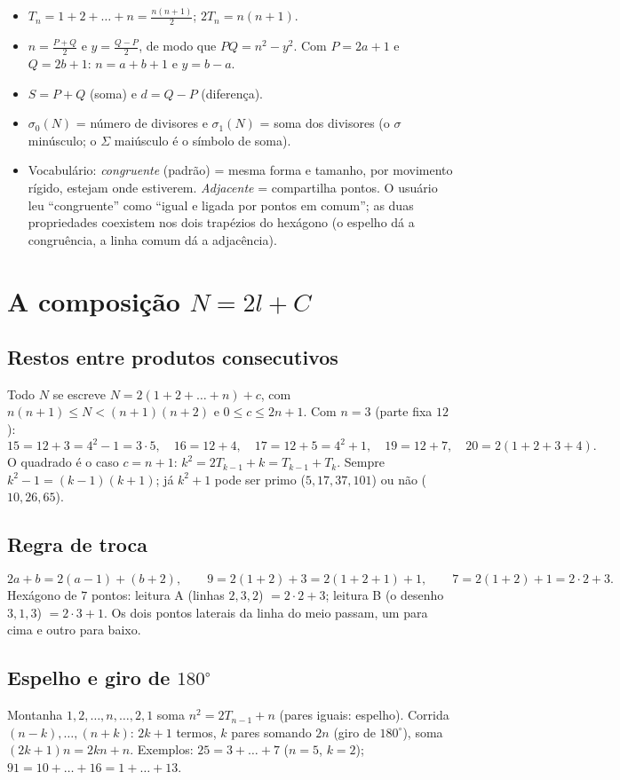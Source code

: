 \documentclass[11pt,a4paper]{article}
\begin{document}
\begin{itemize}[leftmargin=1.4em]
  \item $T_n=1+2+\dots+n=\tfrac{n(n+1)}{2}$; $2T_n=n(n+1)$.
  \item $n=\tfrac{P+Q}{2}$ e $y=\tfrac{Q-P}{2}$, de modo que $PQ=n^2-y^2$. Com $P=2a+1$ e $Q=2b+1$: $n=a+b+1$ e $y=b-a$.
  \item $S=P+Q$ (soma) e $d=Q-P$ (diferença).
  \item $\sigma_0(N)$ = número de divisores e $\sigma_1(N)$ = soma dos divisores (o $\sigma$ minúsculo; o $\Sigma$ maiúsculo é o símbolo de soma).
  \item Vocabulário: \emph{congruente} (padrão) = mesma forma e tamanho, por movimento rígido, estejam onde estiverem. \emph{Adjacente} = compartilha pontos. O usuário leu ``congruente'' como ``igual e ligada por pontos em comum''; as duas propriedades coexistem nos dois trapézios do hexágono (o espelho dá a congruência, a linha comum dá a adjacência).
\end{itemize}

\section{A composição $N=2l+C$}

\subsection{Restos entre produtos consecutivos}
Todo $N$ se escreve $N=2(1+2+\dots+n)+c$, com $n(n+1)\le N<(n+1)(n+2)$ e $0\le c\le 2n+1$. Com $n=3$ (parte fixa $12$):
\[
15=12+3=4^2-1=3\cdot5,\quad 16=12+4,\quad 17=12+5=4^2+1,\quad 19=12+7,\quad 20=2(1+2+3+4).
\]
O quadrado é o caso $c=n+1$: $k^2=2T_{k-1}+k=T_{k-1}+T_k$. Sempre $k^2-1=(k-1)(k+1)$; já $k^2+1$ pode ser primo ($5,17,37,101$) ou não ($10,26,65$).

\subsection{Regra de troca}
\[
2a+b=2(a-1)+(b+2),\qquad 9=2(1+2)+3=2(1+2+1)+1,\qquad 7=2(1+2)+1=2\cdot2+3 .
\]
Hexágono de $7$ pontos: leitura A (linhas $2,3,2$) $=2\cdot2+3$; leitura B (o desenho $3,1,3$) $=2\cdot3+1$. Os dois pontos laterais da linha do meio passam, um para cima e outro para baixo.

\subsection{Espelho e giro de $180^\circ$}
Montanha $1,2,\dots,n,\dots,2,1$ soma $n^2=2T_{n-1}+n$ (pares iguais: espelho). Corrida $(n-k),\dots,(n+k)$: $2k+1$ termos, $k$ pares somando $2n$ (giro de $180^\circ$), soma $(2k+1)n=2kn+n$. Exemplos: $25=3+\dots+7$ ($n=5$, $k=2$); $91=10+\dots+16=1+\dots+13$.
\end{document}
